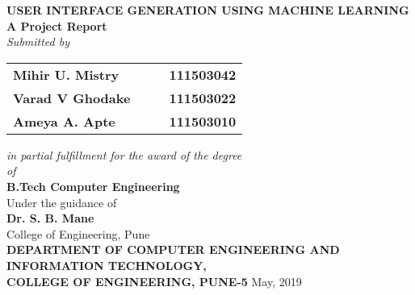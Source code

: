 \begin{titlepage}
\begin{center}
\LARGE{\bf{USER INTERFACE GENERATION USING MACHINE LEARNING\\}}	%
\Large{\bf{A Project Report\\}}		%
\Large{\em{Submitted by\\}}
\begin{table}[htbp]
	\begin{center}
	\begin{tabular}{ l c c l }
	\Large\bf{Mihir U. Mistry} & & & \Large\bf{111503042} \\[0.3cm]
	\Large\bf{Varad V Ghodake} & & & \Large\bf{111503022} \\[0.3cm]
	\Large\bf{Ameya A. Apte} & & & \Large\bf{111503010} \\
	\end{tabular}
	\end{center}
	\end{table}
\Large{\em{in partial fulfillment for the award of the degree\\ \vspace{1.5pt}of\\}}
\LARGE{\bf{B.Tech Computer Engineering\\}}%
\Large{Under the guidance of\\ }
\Large{\bf{Dr. S. B. Mane}\\}
\Large{College of Engineering, Pune\\}
\Large{\bf{DEPARTMENT OF COMPUTER ENGINEERING AND \\INFORMATION TECHNOLOGY,\\
COLLEGE OF ENGINEERING, PUNE-5}}
\vfill
\large{May, 2019}
\end{center}
\end{titlepage}
